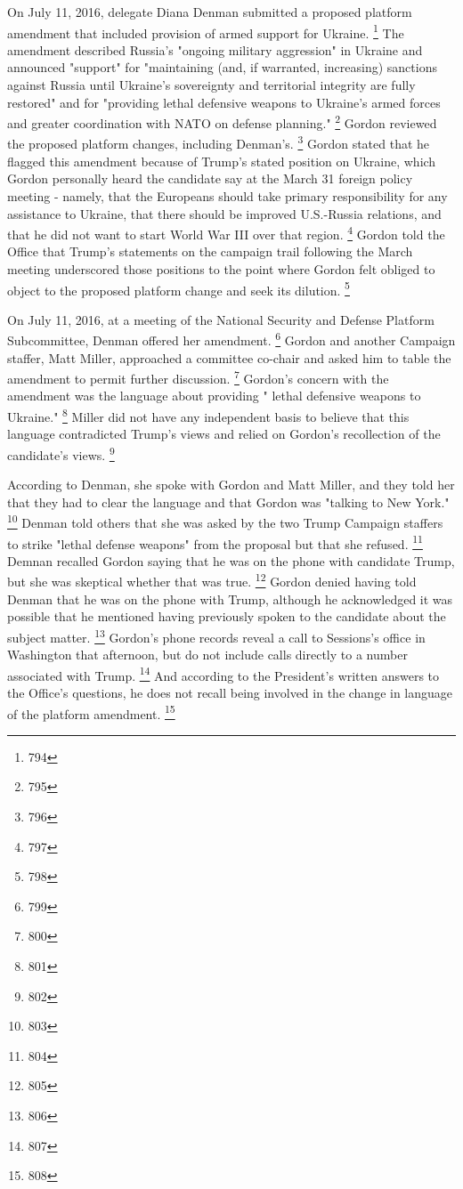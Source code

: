 On July 11, 2016, delegate Diana Denman submitted a proposed platform amendment that included provision of armed support for Ukraine.%
\footnote{794}
The amendment described Russia's "ongoing military aggression" in Ukraine and announced "support" for "maintaining (and, if warranted, increasing) sanctions against Russia until Ukraine's sovereignty and territorial integrity are fully restored" and for "providing lethal defensive weapons to Ukraine's armed forces and greater coordination with NATO on defense planning."%
\footnote{795}
Gordon reviewed the proposed platform changes, including Denman's.%
\footnote{796}
Gordon stated that he flagged this amendment because of Trump's stated position on Ukraine, which Gordon personally heard the candidate say at the March 31 foreign policy meeting - namely, that the Europeans should take primary responsibility for any assistance to Ukraine, that there should be improved U.S.-Russia relations, and that he did not want to start World War III over that region.%
\footnote{797}
Gordon told the Office that Trump's statements on the campaign trail following the March meeting underscored those positions to the point where Gordon felt obliged to object to the proposed platform change and seek its dilution.%
\footnote{798}

On July 11, 2016, at a meeting of the National Security and Defense Platform Subcommittee, Denman offered her amendment.%
\footnote{799}
Gordon and another Campaign staffer, Matt Miller, approached a committee co-chair and asked him to table the amendment to permit further discussion.%
\footnote{800}
Gordon's concern with the amendment was the language about providing " lethal defensive weapons to Ukraine."%
\footnote{801}
Miller did not have any independent basis to believe that this language contradicted Trump's views and relied on Gordon's recollection of the candidate's views.%
\footnote{802}

According to Denman, she spoke with Gordon and Matt Miller, and they told her that they had to clear the language and that Gordon was "talking to New York."%
\footnote{803}
Denman told others that she was asked by the two Trump Campaign staffers to strike "lethal defense weapons" from the proposal but that she refused.%
\footnote{804}
Demnan recalled Gordon saying that he was on the phone with candidate Trump, but she was skeptical whether that was true.%
\footnote{805}
Gordon denied having told Denman that he was on the phone with Trump, although he acknowledged it was possible that he mentioned having previously spoken to the candidate about the subject matter.%
\footnote{806}
Gordon's phone records reveal a call to Sessions's office in Washington that afternoon, but do not include calls directly to a number associated with Trump.%
\footnote{807}
And according to the President's written answers to the Office's questions, he does not recall being involved in the change in language of the platform amendment.%
\footnote{808}

